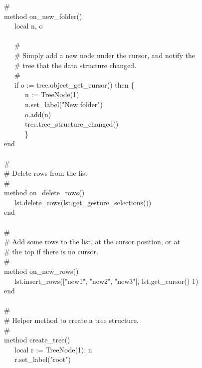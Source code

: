 {\>   \# \\
\>   method on\_new\_folder() \\
\>   \ \ \ local n, o \\
\ \\
\>   \ \ \ \# \\
\>   \ \ \ \# Simply add a new node under the cursor, and notify the \\
\>   \ \ \ \# tree that the data structure changed. \\
\>   \ \ \ \# \\
\>   \ \ \ if o := tree.object\_get\_cursor() then \{ \\
\>   \ \ \ \ \ \ n := TreeNode(1) \\
\>   \ \ \ \ \ \ n.set\_label("New
folder") \\
\>   \ \ \ \ \ \ o.add(n) \\
\>   \ \ \ \ \ \ tree.tree\_structure\_changed() \\
\>   \ \ \ \ \ \ \} \\
\>   end \\
\ \\
\>   \# \\
\>   \# Delete rows from the list \\
\>   \# \\
\>   method on\_delete\_rows() \\
\>   \ \ \ lst.delete\_rows(lst.get\_gesture\_selections()) \\
\>   end \\
\ \\
\>   \# \\
\>   \# Add some rows to the list, at the cursor position, or at \\
\>   \# the top if there is no cursor. \\
\>   \# \\
\>   method on\_new\_rows() \\
\>   \ \ \ lst.insert\_rows(["new1",
"new2",
"new3"], lst.get\_cursor() {\textbar} 1) \\
\>   end \\
\ \\
\>   \# \\
\>   \# Helper method to create a tree structure. \\
\>   \# \\
\>   method create\_tree() \\
\>   \ \ \ local r := TreeNode(1), n \\
\>   \ \ \ r.set\_label("root") \\
\ \\
}
